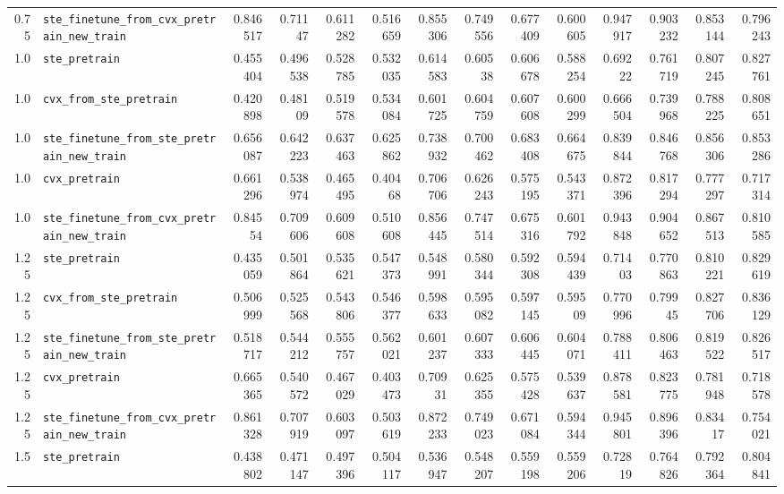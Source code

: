 \begin{longtable}{@{}r l *{12}{r}@{}}
0.75 & \texttt{ste\_finetune\_from\_cvx\_pretrain\_new\_train} & 0.846517 & 0.71147 & 0.611282 & 0.516659 & 0.855306 & 0.749556 & 0.677409 & 0.600605 & 0.947917 & 0.903232 & 0.853144 & 0.796243 \\
1.0 & \texttt{ste\_pretrain} & 0.455404 & 0.496538 & 0.528785 & 0.532035 & 0.614583 & 0.60538 & 0.606678 & 0.588254 & 0.69222 & 0.761719 & 0.807245 & 0.827761 \\
1.0 & \texttt{cvx\_from\_ste\_pretrain} & 0.420898 & 0.48109 & 0.519578 & 0.534084 & 0.601725 & 0.604759 & 0.607608 & 0.600299 & 0.666504 & 0.739968 & 0.788225 & 0.808651 \\
1.0 & \texttt{ste\_finetune\_from\_ste\_pretrain\_new\_train} & 0.656087 & 0.642223 & 0.637463 & 0.625862 & 0.738932 & 0.700462 & 0.683408 & 0.664675 & 0.839844 & 0.846768 & 0.856306 & 0.853286 \\
1.0 & \texttt{cvx\_pretrain} & 0.661296 & 0.538974 & 0.465495 & 0.40468 & 0.706706 & 0.626243 & 0.575195 & 0.543371 & 0.872396 & 0.817294 & 0.777297 & 0.717314 \\
1.0 & \texttt{ste\_finetune\_from\_cvx\_pretrain\_new\_train} & 0.84554 & 0.709606 & 0.609608 & 0.510608 & 0.856445 & 0.747514 & 0.675316 & 0.601792 & 0.943848 & 0.904652 & 0.867513 & 0.810585 \\
1.25 & \texttt{ste\_pretrain} & 0.435059 & 0.501864 & 0.535621 & 0.547373 & 0.548991 & 0.580344 & 0.592308 & 0.594439 & 0.71403 & 0.770863 & 0.810221 & 0.829619 \\
1.25 & \texttt{cvx\_from\_ste\_pretrain} & 0.506999 & 0.525568 & 0.543806 & 0.546377 & 0.598633 & 0.595082 & 0.597145 & 0.59509 & 0.770996 & 0.79945 & 0.827706 & 0.836129 \\
1.25 & \texttt{ste\_finetune\_from\_ste\_pretrain\_new\_train} & 0.518717 & 0.544212 & 0.555757 & 0.562021 & 0.601237 & 0.607333 & 0.606445 & 0.604071 & 0.788411 & 0.806463 & 0.819522 & 0.826517 \\
1.25 & \texttt{cvx\_pretrain} & 0.665365 & 0.540572 & 0.467029 & 0.403473 & 0.70931 & 0.625355 & 0.575428 & 0.539637 & 0.878581 & 0.823775 & 0.781948 & 0.718578 \\
1.25 & \texttt{ste\_finetune\_from\_cvx\_pretrain\_new\_train} & 0.861328 & 0.707919 & 0.603097 & 0.503619 & 0.872233 & 0.749023 & 0.671084 & 0.594344 & 0.945801 & 0.896396 & 0.83417 & 0.754021 \\
1.5 & \texttt{ste\_pretrain} & 0.438802 & 0.471147 & 0.497396 & 0.504117 & 0.536947 & 0.548207 & 0.559198 & 0.559206 & 0.72819 & 0.764826 & 0.792364 & 0.804841 \\

\end{longtable}

